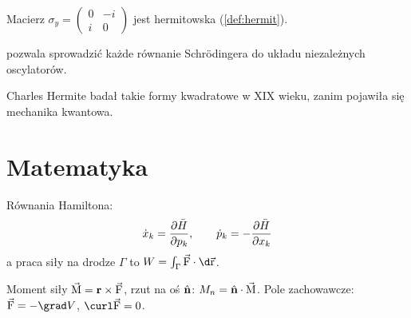 \documentclass[a4paper, polish, 11pt]{scrartcl}
\begin{document}
\begin{example}
Macierz $\sigma_y = \begin{pmatrix} 0 & -i \\ i & 0 \end{pmatrix}$ jest hermitowska (\cref{def:hermit}).
\end{example}

\begin{remark}
 pozwala sprowadzić każde równanie Schrödingera do układu niezależnych oscylatorów.
\end{remark}

\begin{aside}
Charles Hermite badał takie formy kwadratowe w XIX wieku, zanim pojawiła się mechanika kwantowa.
\end{aside}

\section{Matematyka}\label{sec:matematyka}

Równania Hamiltona:
\begin{equation}
	\dot{x}_k = \pdv{\bar H}{p_k}, \qquad \dot{p}_k = -\pdv{\bar H}{x_k}
	\label{eq:hamilton}
\end{equation}
a praca siły na drodze $\Gamma$ to $W = \int_\Gamma \va{F} \vdot \d\va{r}$.

Moment siły $\va{M} = \vb{r} \cross \va{F}$, rzut na oś $\vu{n}$: $M_n = \vu{n} \vdot \va{M}$. Pole zachowawcze: $\va{F} = -\grad V$, $\curl\va{F} = 0$.
\end{document}
